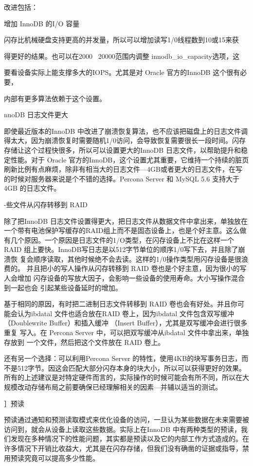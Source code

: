 改进包括：

增加 InnoDB 的I/O 容量

闪存比机械硬盘支持更高的并发量，所以可以增加读写1/0线程数到10或15来获

得更好的结果。也可以在2000 ~20000范围内调整 innodb\_io\_capacity选项，这

要看设备实际上能支撑多大的IOPS。尤其是对 Oracle 官方的InnoDB 这个很有必要，

内部有更多算法依赖于这个设置。

nnoDB 日志文件更大

即使最近版本的InnoDB 中改进了崩溃恢复算法，也不应该把磁盘上的日志文件调
得太大，因为崩溃恢复时需要随机1/0访问，会导致恢复需要很长一段时间。闪存
存储让这个过程快很多，所以可以设置更大的InnoDB 日志文件，以帮助提升和稳
定性能。对于 Oracle 官方的InnoDB，这个设置尤其重要，它维持一个持续的脏页
刷新比例有点麻烦，除非有相当大的日志文件—4GB或者更大的日志文件，在写
的时候对服务器来说是个不错的选择。Percona Server 和 MySQL 5.6 支持大于 4GB
的日志文件。

-些文件从闪存转移到 RAID

除了把InnoDB 日志文件设置得更大，把日志文件从数据文件中拿出来，单独放在
一个带有电池保护写缓存的RAID组上而不是固态设备上，也是个好主意。这么做
有几个原因。一个原因是日志文件的1/O类型，在闪存设备上不比在这样一个 RAID
组上要快。InnoDB写日志是以512字节单位的顺序1/0写下去，并且除了崩溃恢
复会顺序读取，其他时候绝不会去读。这样的1/0操作类型用闪存设备是很浪费的。
并且把小的写人操作从闪存转移到 RAID 卷也是个好主意，因为很小的写人会增加
闪存设备的写放大因子，会影响一些设备的使用寿命。大小写操作混合到一起也会
引起某些设备延时的增加。

基于相同的原因，有时把二进制日志文件转移到 RAID 卷也会有好处。并且你可
能会认为ibdatal 文件也适合放在RAID 卷上，因为ibdatal 文件包含双写缓冲
（Doublewrite Buffer）和插入缓冲 （Insert Buffer），尤其是双写缓冲会进行很多重复
写入。在 Percona Server 中，可以把双写缓冲从ibdatal 文件中拿出来，单独存放到
一个文件，然后把这个文件放在 RAID 卷上。

还有另一个选择：可以利用Percona Server 的特性，使用4KB的块写事务日志，而
不是512字节。因这会匹配大部分闪存本身的块大小，所以可以获得更好的效果。
所有的上述建议是对特定硬件而言的，实际操作的时候可能会有所不同，所以在大
规模改动存储布局之前要确保已经理解相关的因素—并辅以适当的测试。

］预读

预读通过通知和预测读取模式来优化设备的访问，一旦认为某些数据在未来需要被
访问到，就会从设备上读取这些数据。实际上在InnoDB 中有两种类型的预读，我
们发现在多种情况下的性能问题，其实都是预读以及它的内部工作方式造成的。在
许多情况下开销比收益大，尤其是在闪存存储，但我们没有确凿的证据或指导，禁
用预读究竟可以提高多少性能。

